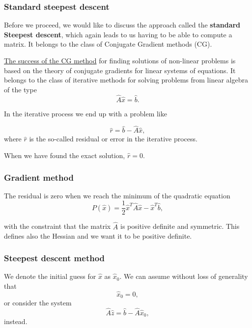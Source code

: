 \documentclass{beamer}
\begin{document}
\begin{frame}
\frametitle{Standard steepest descent}

Before we proceed, we would like to discuss the approach called the
\textbf{standard Steepest descent}, which again leads to us having to be able
to compute a matrix. It belongs to the class of Conjugate Gradient methods (CG).

\href{{https://www.cs.cmu.edu/~quake-papers/painless-conjugate-gradient.pdf}}{The success of the CG method}
for finding solutions of non-linear problems is based on the theory
of conjugate gradients for linear systems of equations. It belongs to
the class of iterative methods for solving problems from linear
algebra of the type 
\begin{equation*} 
\hat{A}\hat{x} = \hat{b}.
\end{equation*} 

In the iterative process we end up with a problem like

\begin{equation*}
  \hat{r}= \hat{b}-\hat{A}\hat{x},
\end{equation*}
where $\hat{r}$ is the so-called residual or error in the iterative process.

When we have found the exact solution, $\hat{r}=0$.
\end{frame}

\begin{frame}
\frametitle{Gradient method}

The residual is zero when we reach the minimum of the quadratic equation
\begin{equation*}
  P(\hat{x})=\frac{1}{2}\hat{x}^T\hat{A}\hat{x} - \hat{x}^T\hat{b},
\end{equation*}

with the constraint that the matrix $\hat{A}$ is positive definite and
symmetric.  This defines also the Hessian and we want it to be  positive definite.
\end{frame}

\begin{frame}
\frametitle{Steepest descent  method}

We denote the initial guess for $\hat{x}$ as $\hat{x}_0$. 
We can assume without loss of generality that
\begin{equation*}
\hat{x}_0=0,
\end{equation*}
or consider the system
\begin{equation*}
\hat{A}\hat{z} = \hat{b}-\hat{A}\hat{x}_0,
\end{equation*}
instead.
\end{frame}
\end{document}
